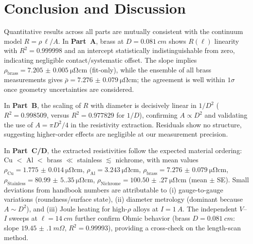 \documentclass[12pt]{article}
\numberwithin{equation}{section}
\begin{document}
\section{Conclusion and Discussion}
Quantitative results across all parts are mutually consistent with the continuum model $R=\rho\,\ell/A$. In \textbf{Part~A}, brass at $D=\SI{0.081}{cm}$ shows $R(\ell)$ linearity with $R^2=\num{0.999998}$ and an intercept statistically indistinguishable from zero, indicating negligible contact/systematic offset. The slope implies $\rho_{\text{brass}}=\SI{7.205(5)}{\micro\ohm\centi\metre}$ (fit-only), while the ensemble of all brass measurements gives $\bar\rho=\SI{7.276(79)}{\micro\ohm\centi\metre}$; the agreement is well within $1\sigma$ once geometry uncertainties are considered.

In \textbf{Part~B}, the scaling of $R$ with diameter is decisively linear in $1/D^2$ ($R^2=\num{0.998509}$, versus $R^2=\num{0.977829}$ for $1/D$), confirming $A\propto D^2$ and validating the use of $A=\pi D^2/4$ in the resistivity extraction. Residuals show no structure, suggesting higher-order effects are negligible at our measurement precision.

In \textbf{Part~C/D}, the extracted resistivities follow the expected material ordering: 
Cu $<$ Al $<$ brass $\ll$ stainless $\lesssim$ nichrome, with mean values
$\rho_{\text{Cu}}=\SI{1.775(14)}{\micro\ohm\centi\metre}$,
$\rho_{\text{Al}}=\SI{3.243}{\micro\ohm\centi\metre}$,
$\rho_{\text{brass}}=\SI{7.276(79)}{\micro\ohm\centi\metre}$,
$\rho_{\text{Stainless}}=\SI{80.99(5.35)}{\micro\ohm\centi\metre}$,
$\rho_{\text{Nichrome}}=\SI{100.50(27)}{\micro\ohm\centi\metre}$ (mean $\pm$ SE).
Small deviations from handbook numbers are attributable to (i) gauge-to-gauge variations (roundness/surface state), 
(ii) diameter metrology (dominant because $A\sim D^2$), and 
(iii) Joule heating for high-$\rho$ alloys at $I=\SI{1}{A}$.
The independent $V$--$I$ sweeps at $\ell=\SI{14}{cm}$ further confirm Ohmic behavior (brass $D=\SI{0.081}{cm}$: slope $\SI{19.45(10)}{m\Omega}$, $R^2=\num{0.99993}$), providing a cross-check on the length-scan method.

\end{document}
